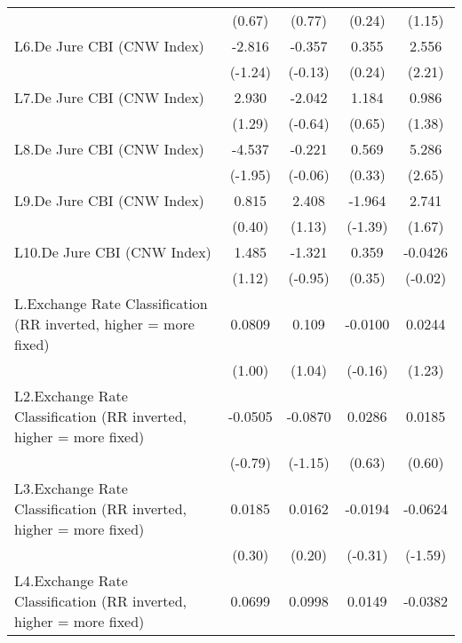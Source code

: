 {\begin{longtable}{l*{4}{c}}
                &   (0.67)         &   (0.77)         &   (0.24)         &   (1.15)         \\
[1em]
L6.De Jure CBI (CNW Index)&   -2.816         &   -0.357         &    0.355         &    2.556\sym{*}  \\
                &  (-1.24)         &  (-0.13)         &   (0.24)         &   (2.21)         \\
[1em]
L7.De Jure CBI (CNW Index)&    2.930         &   -2.042         &    1.184         &    0.986         \\
                &   (1.29)         &  (-0.64)         &   (0.65)         &   (1.38)         \\
[1em]
L8.De Jure CBI (CNW Index)&   -4.537         &   -0.221         &    0.569         &    5.286\sym{**} \\
                &  (-1.95)         &  (-0.06)         &   (0.33)         &   (2.65)         \\
[1em]
L9.De Jure CBI (CNW Index)&    0.815         &    2.408         &   -1.964         &    2.741         \\
                &   (0.40)         &   (1.13)         &  (-1.39)         &   (1.67)         \\
[1em]
L10.De Jure CBI (CNW Index)&    1.485         &   -1.321         &    0.359         &  -0.0426         \\
                &   (1.12)         &  (-0.95)         &   (0.35)         &  (-0.02)         \\
[1em]
L.Exchange Rate Classification (RR inverted, higher = more fixed)&   0.0809         &    0.109         &  -0.0100         &   0.0244         \\
                &   (1.00)         &   (1.04)         &  (-0.16)         &   (1.23)         \\
[1em]
L2.Exchange Rate Classification (RR inverted, higher = more fixed)&  -0.0505         &  -0.0870         &   0.0286         &   0.0185         \\
                &  (-0.79)         &  (-1.15)         &   (0.63)         &   (0.60)         \\
[1em]
L3.Exchange Rate Classification (RR inverted, higher = more fixed)&   0.0185         &   0.0162         &  -0.0194         &  -0.0624         \\
                &   (0.30)         &   (0.20)         &  (-0.31)         &  (-1.59)         \\
[1em]
L4.Exchange Rate Classification (RR inverted, higher = more fixed)&   0.0699         &   0.0998         &   0.0149         &  -0.0382         \\

\end{longtable}}
